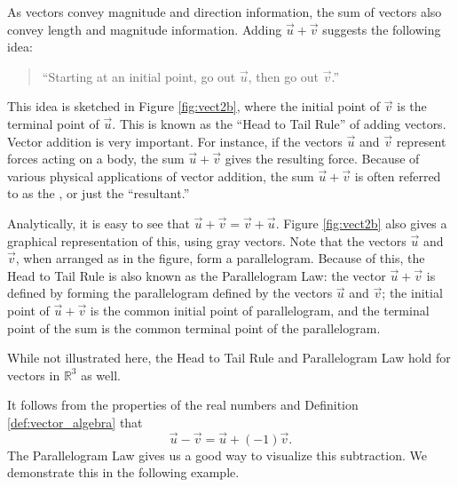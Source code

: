 As vectors convey magnitude and direction information, the sum of vectors also convey length and magnitude information. Adding $\vec u+\vec v$ suggests the following idea:
\begin{quotation}
``Starting at an initial point, go out $\vec u$, then go out $\vec v$.''
\end{quotation}

This idea is sketched in Figure \ref{fig:vect2b}, where the initial point of $\vec v$ is the terminal point of $\vec u$. This is known as the ``Head to Tail Rule'' of adding vectors. Vector addition is very important. For instance, if the vectors $\vec u$ and $\vec v$ represent forces acting on a body, the sum $\vec u+\vec v$ gives the resulting force. Because of various physical applications of vector addition, the sum $\vec u+\vec v$ is often referred to as the , or just the ``resultant.''

Analytically, it is easy to see that $\vec u+\vec v = \vec v+\vec u$. Figure \ref{fig:vect2b} also gives a graphical representation of this, using gray vectors. Note that the vectors $\vec u$ and $\vec v$, when arranged as in the figure, form a parallelogram. Because of this, the Head to Tail Rule is also known as the Parallelogram Law: the vector $\vec u+\vec v$ is defined by forming the parallelogram defined by the vectors $\vec u$ and $\vec v$; the initial point of $\vec u+\vec v$ is the common initial point of parallelogram, and the terminal point of the sum is the common terminal point of the parallelogram.

While not illustrated here, the Head to Tail Rule and Parallelogram Law hold for vectors in $\mathbb{R}^3$ as well.

It follows from the properties of the real numbers and Definition \ref{def:vector_algebra} that 
\[
\vec u-\vec v = \vec u + (-1)\vec v.
\]
The Parallelogram Law gives us a good way to visualize this subtraction. We demonstrate this in the following example.\\

